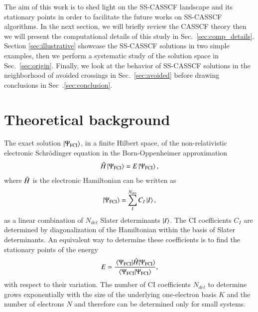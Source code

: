 \documentclass[aps,prb,reprint,showkeys,superscriptaddress]{revtex4-1}
\begin{document}
The aim of this work is to shed light on the SS-CASSCF landscape and its stationary points in order to facilitate the future works on SS-CASSCF algorithms.
In the next section, we will briefly review the CASSCF theory then we will present the computational details of this study in Sec.~\ref{sec:comp_details}. Section \ref{sec:illustrative} showcase the SS-CASSCF solutions in two simple examples, then we perform a systematic study of the solution space in Sec.~\ref{sec:origin}.
Finally, we look at the behavior of SS-CASSCF solutions in the neighborhood of avoided crossings in Sec.~\ref{sec:avoided} before drawing conclusions in Sec~.\ref{sec:conclusion}.

\section{Theoretical background}
\label{sec:theoretical}

The exact solution $\ket{\Psi_{\text{FCI}}}$, in a finite Hilbert space, of the non-relativistic electronic Schr\"odinger equation in the Born-Oppenheimer approximation
\begin{equation}
  \label{eq:schro_eq}
  \Hat{H} \ket{\Psi_{\text{FCI}}} = E \ket{\Psi_{\text{FCI}}},
\end{equation}
where $\Hat{H}$ is the electronic Hamiltonian can be written as \cite{Szabo_1996}
\begin{equation}
  \label{eq:fci_wf}
  \ket{\Psi_{\text{FCI}}} = \sum_I^{N_{det}} C_I\ket{I},
\end{equation}
\ie as a linear combination of $N_{det}$ Slater determinants $\ket{I}$.
The CI coefficients $C_I$ are determined by diagonalization of the Hamiltonian within the basis of Slater determinants.
An equivalent way to determine these coefficients is to find the stationary points of the energy
\begin{equation}
  \label{eq:fci_nrj}
  E = \frac{\mel{\Psi_{\text{FCI}}}{\Hat{H}}{\Psi_{\text{FCI}}}}{\braket{\Psi_{\text{FCI}}}{\Psi_{\text{FCI}}}},
\end{equation}
 with respect to their variation.
The number of CI coefficients $N_{det}$ to determine grows exponentially with the size of the underlying one-electron basis $K$ and the number of electrons $N$ and therefore can be determined only for small systems.
\end{document}
